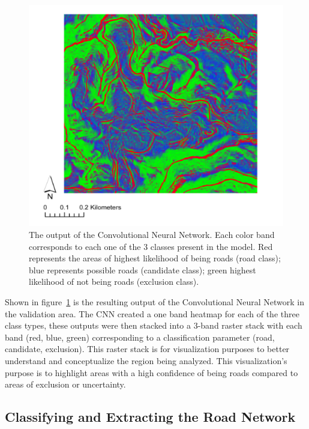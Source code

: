 \documentclass[remotesensing,article,submit,pdftex,moreauthors]{Definitions/mdpi}
\begin{document}
\begin{figure}[H]
\includegraphics[width=10.5 cm]{cnn.png}
\caption{The output of the Convolutional Neural Network. Each color band corresponds to each one of the 3 classes present in the model. Red represents the areas of highest likelihood of being roads (road class); blue represents possible roads (candidate class); green highest likelihood of not being roads (exclusion class). \label{fig5}}
\end{figure}   
Shown in figure~\ref{fig5} is the resulting output of the Convolutional Neural Network in the validation area. The CNN created a one band heatmap for each of the three class types, these outputs were then stacked into a 3-band raster stack with each band (red, blue, green) corresponding to a classification parameter (road, candidate, exclusion). This raster stack is for visualization purposes to better understand and conceptualize the region being analyzed. This visualization’s purpose is to highlight areas with a high confidence of being roads compared to areas of exclusion or uncertainty.

\subsection{Classifying and Extracting the Road Network}
\end{document}
